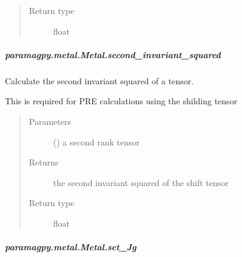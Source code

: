 \documentclass[a4paper,10pt,english,openany,oneside]{sphinxmanual}
\begin{document}
\begin{fulllineitems}
\begin{fulllineitems}
\begin{fulllineitems}
\begin{quote}
\begin{description}
\item[{Return type}] \leavevmode
float

\end{description}\end{quote}

\end{fulllineitems}



\subparagraph{paramagpy.metal.Metal.second\_invariant\_squared}
\label{\detokenize{reference/generated/paramagpy.metal.Metal.second_invariant_squared:paramagpy-metal-metal-second-invariant-squared}}\label{\detokenize{reference/generated/paramagpy.metal.Metal.second_invariant_squared::doc}}

\begin{fulllineitems}
\label{\detokenize{reference/generated/paramagpy.metal.Metal.second_invariant_squared:paramagpy.metal.Metal.second_invariant_squared}}
Calculate the second invariant squared of a tensor.

This is required for PRE calculations using the shilding tensor
\begin{quote}\begin{description}
\item[{Parameters}] \leavevmode
{} () \textendash{} a second rank tensor

\item[{Returns}] \leavevmode
{} \textendash{} the second invariant squared of the shift tensor

\item[{Return type}] \leavevmode
float

\end{description}\end{quote}

\end{fulllineitems}



\subparagraph{paramagpy.metal.Metal.set\_Jg}
\label{\detokenize{reference/generated/paramagpy.metal.Metal.set_Jg:paramagpy-metal-metal-set-jg}}\label{\detokenize{reference/generated/paramagpy.metal.Metal.set_Jg::doc}}


\end{fulllineitems}
\end{fulllineitems}
\end{document}
